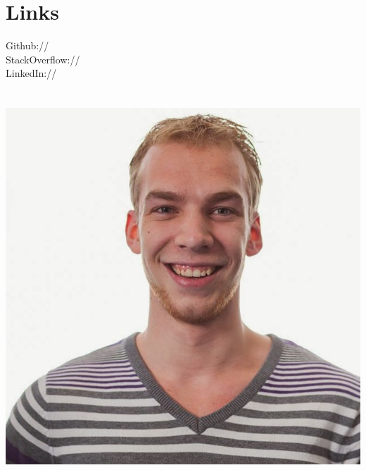 \documentclass[]{deedy-resume-openfont}
\begin{document}
\begin{minipage}[t]{0.33\textwidth}

\section{Links} 
Github:// \href{https://github.com/eernie}{} \\
StackOverflow:// \href{http://stackoverflow.com/users/1956445/eernie}{}\\
LinkedIn://  \href{https://www.linkedin.com/in/erwinoldenkamp}{}
\sectionsep

\section*{}
\vspace{-0.3in}
\includegraphics[width=.8\textwidth]{pasfoto}

%
%

\end{minipage} 
\hfill
\end{document}
